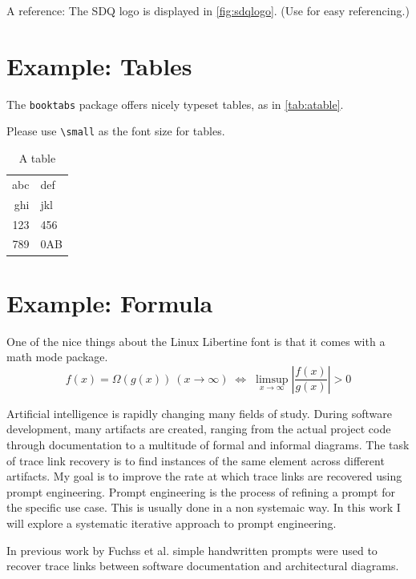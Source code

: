 A reference: The SDQ logo is displayed in \autoref{fig:sdqlogo}. 
(Use  for easy referencing.) 

\section{Example: Tables}
The \texttt{booktabs} package offers nicely typeset tables, as in \autoref{tab:atable}.

Please use \texttt{\textbackslash small} as the font size for tables.

\label{sec:Introduction:Tables}
\begin{table}
\centering\small
\begin{tabular}{r l}
\toprule
abc & def\\
ghi & jkl\\
\midrule
123 & 456\\
789 & 0AB\\
\bottomrule
\end{tabular}
\caption{A table}
\label{tab:atable}
\end{table}

\section{Example: Formula}
One of the nice things about the Linux Libertine font is that it comes with
a math mode package.
\begin{displaymath}
f(x)=\Omega(g(x))\ (x\rightarrow\infty)\;\Leftrightarrow\;
\limsup_{x \to \infty} \left|\frac{f(x)}{g(x)}\right|> 0
\end{displaymath}


Artificial intelligence is rapidly changing many fields of study.
During software development, many artifacts are created, ranging from the actual project code through documentation to a multitude of formal and informal diagrams. The task of trace link recovery is to find instances of the same element across different artifacts. 
My goal is to improve the rate at which trace links are recovered using prompt engineering. Prompt engineering is the process of refining a prompt for the specific use case. This is usually done in a non systemaic way. In this work I will explore a systematic iterative approach to prompt engineering. 

In previous work by Fuchss et al. %
simple handwritten prompts were used to recover trace links between software documentation and architectural diagrams. 